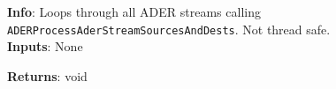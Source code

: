 \textbf{Info}: Loops through all ADER streams calling
\texttt{ADERProcessAderStreamSourcesAndDests}. Not thread safe. \\

\noindent \textbf{Inputs}: None

\noindent \textbf{Returns}: void

